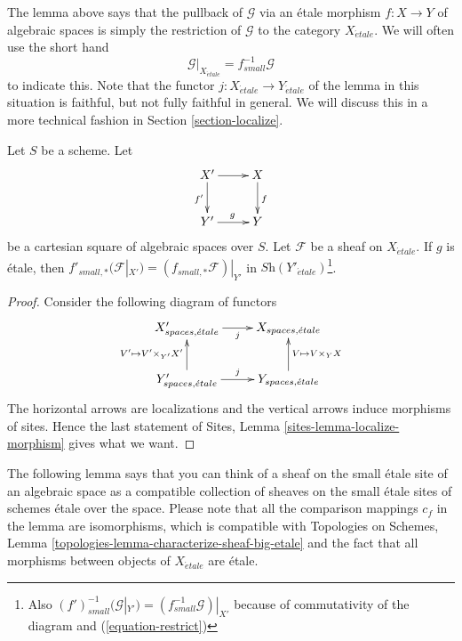 \noindent
The lemma above says that the pullback of $\mathcal{G}$ via an \'etale morphism
$f : X \to Y$ of algebraic spaces is simply the restriction of $\mathcal{G}$
to the category $X_{\acute{e}tale}$. We will often use the short hand
\begin{equation}
\label{equation-restrict}
\mathcal{G}|_{X_{\acute{e}tale}} = f_{small}^{-1}\mathcal{G}
\end{equation}
to indicate this. Note that the functor
$j : X_{\acute{e}tale} \to Y_{\acute{e}tale}$
of the lemma in this situation is faithful, but not fully faithful in
general. We will discuss this in a more technical fashion in
Section \ref{section-localize}.

\begin{lemma}
\label{lemma-pushforward-etale-base-change}
Let $S$ be a scheme. Let
$$
\xymatrix{
X' \ar[r] \ar[d]_{f'} & X \ar[d]^f \\
Y' \ar[r]^g & Y
}
$$
be a cartesian square of algebraic spaces over $S$. Let
$\mathcal{F}$ be a sheaf on $X_{\acute{e}tale}$. If $g$ is \'etale, then
$f'_{small, *}(\mathcal{F}|_{X'}) = (f_{small, *}\mathcal{F})|_{Y'}$ in
$\textit{Sh}(Y'_{\acute{e}tale})$\footnote{Also
$(f')_{small}^{-1}(\mathcal{G}|_{Y'}) = (f_{small}^{-1}\mathcal{G})|_{X'}$
because of commutativity of the diagram and (\ref{equation-restrict})}.
\end{lemma}

\begin{proof}
Consider the following diagram of functors
$$
\xymatrix{
X'_{spaces, \acute{e}tale} \ar[r]_j &
X_{spaces, \acute{e}tale} \\
Y'_{spaces, \acute{e}tale} \ar[r]^j \ar[u]^{V' \mapsto V' \times_{Y'} X'} &
Y_{spaces, \acute{e}tale} \ar[u]_{V \mapsto V \times_Y X}
}
$$
The horizontal arrows are localizations and the vertical arrows induce
morphisms of sites. Hence the last statement of
Sites, Lemma \ref{sites-lemma-localize-morphism}
gives what we want.
\end{proof}

\noindent
The following lemma says that you can think of a sheaf on the small
\'etale site of an algebraic space as a compatible collection of sheaves
on the small \'etale sites of schemes \'etale over the space. Please note
that all the comparison mappings $c_f$ in the lemma are isomorphisms,
which is compatible with
Topologies on Schemes,
Lemma \ref{topologies-lemma-characterize-sheaf-big-etale}
and the fact that all morphisms between objects of $X_{\acute{e}tale}$
are \'etale.

